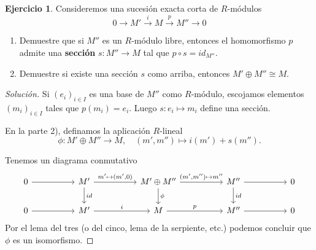 \documentclass{article}
\newcounter{tarea}
\theoremstyle{definition}
\newtheorem{ejercicio}{Ejercicio}[tarea]
\newenvironment{solucion}{\begin{proof}[Solución]}{\end{proof}}
\begin{document}
\begin{ejercicio}
  Consideremos una sucesión exacta corta de $R$-módulos
  $$0 \to M' \xrightarrow{i} M \xrightarrow{p} M'' \to 0$$

  \begin{enumerate}
  \item[1)] Demuestre que si $M''$ es un $R$-módulo libre, entonces
    el homomorfismo $p$ admite una \textbf{sección} $s\colon M'' \to M$
    tal que $p\circ s = id_{M''}$.

  \item[2)] Demuestre si existe una sección $s$ como arriba, entonces
    $M'\oplus M'' \cong M$.
  \end{enumerate}

  \ifdefined\solutions
  \begin{solucion}
    Si $(e_i)_{i \in I}$ es una base de $M''$ como $R$-módulo, escojamos
    elementos $(m_i)_{i \in I}$ tales que $p (m_i) = e_i$.
    Luego $s\colon e_i \mapsto m_i$ define una sección.

    En la parte 2), definamos la aplicación $R$-lineal
    \[ \phi\colon M'\oplus M'' \to M, \quad
      (m', m'') \mapsto i (m') + s (m''). \]

    Tenemos un diagrama conmutativo
    \[ \begin{tikzcd}[column sep=5em]
        0 \ar{r} & M' \ar{r}{m' \mapsto (m',0)}\ar{d}{id} & M'\oplus M'' \ar{r}{(m',m'') \mapsto m''}\ar{d}{\phi} & M'' \ar{r}\ar{d}{id} & 0 \\
        0 \ar{r} & M' \ar{r}{i} & M \ar{r}{p} & M'' \ar{r} & 0
      \end{tikzcd} \]
    Por el lema del tres (o del cinco, lema de la serpiente, etc.) podemos
    concluir que $\phi$ es un isomorfismo.
  \end{solucion}
  \fi
\end{ejercicio}
\end{document}
